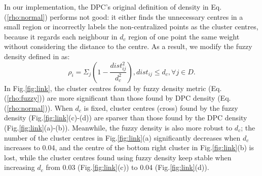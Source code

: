 \documentclass{llncs}
\begin{document}
In our implementation, the DPC's original definition of density in Eq. (\ref{rho:normal}) performs not good: it either finds the unnecessary centres in a small region or incorrectly labels the non-centralized points as the cluster centres, because it regards each neighbour in $d_{c}$ region of one point the same weight without considering the distance to the centre. 
As a result, we modify the fuzzy density defined in \cite{fuzzy} as:
\begin{equation}
\rho_{i} = \Sigma_{j}\left(1 - \frac{ dist_{ij}^{2}}{d_{c}^{2}}\right),dist_{ij} \leq d_{c}, \forall j \in D.
\label{rho:fuzzy}
\end{equation}
In Fig.\ref{fig:link}, the cluster centres found by fuzzy density metric (Eq. (\ref{rho:fuzzy})) are more significant than those found by DPC density (Eq. (\ref{rho:normal})).
When $d_{c}$ is fixed, cluster centres (cross) found by the fuzzy density (Fig.\ref{fig:link}(c)-(d)) are sparser than those found by the DPC density (Fig.\ref{fig:link}(a)-(b)). Meanwhile, the fuzzy density is also more robust to $d_{c}$; the number of the cluster centres in Fig.\ref{fig:link}(a) significantly decreases when $d_{c}$ increases to 0.04, and the centre of the bottom right cluster in Fig.\ref{fig:link}(b) is lost, while the cluster centres found using fuzzy density keep stable when increasing $d_{c}$ from 0.03 (Fig.\ref{fig:link}(c)) to 0.04 (Fig.\ref{fig:link}(d)).
%
\end{document}
